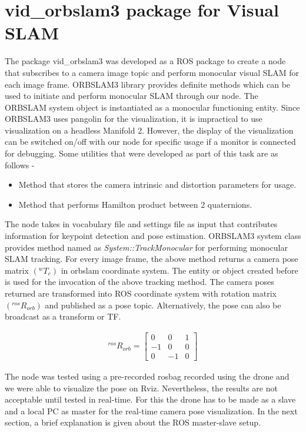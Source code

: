 \section{vid\_orbslam3 package for Visual SLAM}
\label{sec:initialpackagevslam}
The package vid\_orbslam3 was developed as a ROS package to create a node that subscribes to a camera image topic and perform monocular visual SLAM for each image frame. ORBSLAM3 library provides definite methods which can be used to initiate and perform monocular SLAM through our node. The ORBSLAM system object is instantiated as a monocular functioning entity. Since ORBSLAM3 uses pangolin for the visualization, it is impractical to use visualization on a headless Manifold 2. However, the display of the visualization can be switched on/off with our node for specific usage if a monitor is connected for debugging. Some utilities that were developed as part of this task are as follows -
\begin{itemize}
    \item Method that stores the camera intrinsic and distortion parameters for usage.
    \item Method that performs Hamilton product between 2 quaternions.
\end{itemize}
The node takes in vocabulary file and settings file as input that contributes information for keypoint detection and pose estimation. ORBSLAM3 system class provides method named as \emph{System::TrackMonocular} for performing monocular SLAM tracking. For every image frame, the above method returns a camera pose matrix \((^wT_c)\) in orbslam coordinate system. The entity or object created before is used for the invocation of the above tracking method. The camera poses returned are transformed into ROS coordinate system with rotation matrix \((^{ros}R_{orb})\) and published as a pose topic. Alternatively, the pose can also be broadcast as a transform or TF.

\begin{align}
   ^{ros}R_{orb} =
   \begin{bmatrix}
   0 & 0 & 1\\
  -1 & 0 & 0\\
   0 & -1 & 0
   \end{bmatrix}
\end{align}

The node was tested using a pre-recorded rosbag recorded using the drone and we were able to visualize the pose on Rviz. Nevertheless, the results are not acceptable until tested in real-time. For this the drone has to be made as a slave and a local PC as master for the real-time camera pose visualization. In the next section, a brief explanation is given about the ROS master-slave setup.

